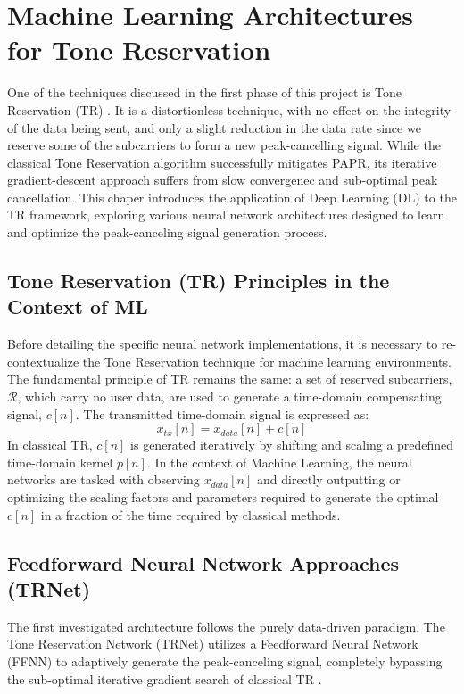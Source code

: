 \chapter{Machine Learning Architectures for Tone Reservation}
\label{ch:dl_tr}

One of the techniques discussed in the first phase of this project is Tone Reservation (TR) \cite{original_tr}. It is a distortionless technique, with no effect on the integrity of the data being sent, and only a slight reduction in the data rate since we reserve some of the subcarriers to form a new peak-cancelling signal. While the classical Tone Reservation algorithm successfully mitigates PAPR, its iterative gradient-descent approach suffers from slow convergenec and sub-optimal peak cancellation. This chaper introduces the application of Deep Learning (DL) to the TR framework, exploring various neural network architectures designed to learn and optimize the peak-canceling signal generation process.

\section{Tone Reservation (TR) Principles in the Context of ML}
Before detailing the specific neural network implementations, it is necessary to re-contextualize the Tone Reservation technique for machine learning environments. The fundamental principle of TR remains the same: a set of reserved subcarriers, $\mathcal{R}$, which carry no user data, are used to generate a time-domain compensating signal, $c[n]$. The transmitted time-domain signal is expressed as:
\begin{equation*}
    x_{tx}[n] = x_{data}[n] + c[n]
\end{equation*} \cite{original_tr}
In classical TR, $c[n]$ is generated iteratively by shifting and scaling a predefined time-domain kernel $p[n]$. In the context of Machine Learning, the neural networks are tasked with observing $x_{data}[n]$ and directly outputting or optimizing the scaling factors and parameters required to generate the optimal $c[n]$ in a fraction of the time required by classical methods.

\section{Feedforward Neural Network Approaches (TRNet)}
The first investigated architecture follows the purely data-driven paradigm. The Tone Reservation Network (TRNet) utilizes a Feedforward Neural Network (FFNN) to adaptively generate the peak-canceling signal, completely bypassing the sub-optimal iterative gradient search of classical TR \cite{trnet}.

